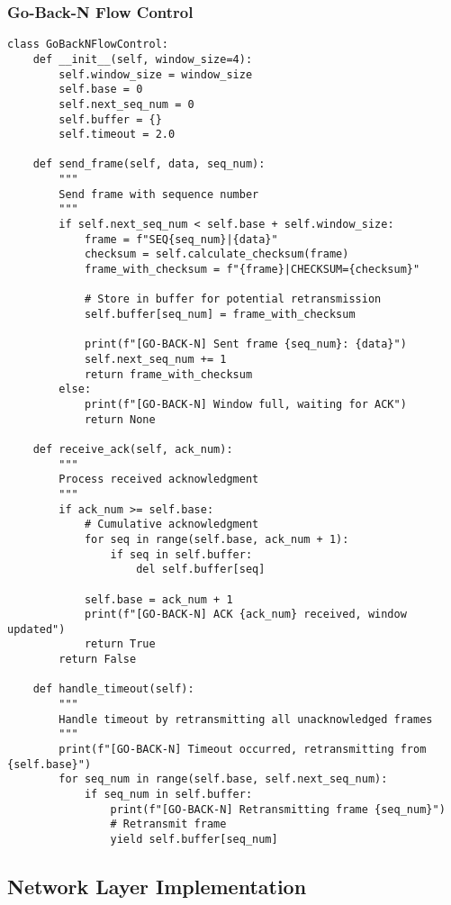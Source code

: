 \documentclass[12pt,a4paper]{article}
\begin{document}
\subsubsection{Go-Back-N Flow Control}

\begin{lstlisting}[caption=Go-Back-N Protocol Implementation]
class GoBackNFlowControl:
    def __init__(self, window_size=4):
        self.window_size = window_size
        self.base = 0
        self.next_seq_num = 0
        self.buffer = {}
        self.timeout = 2.0
        
    def send_frame(self, data, seq_num):
        """
        Send frame with sequence number
        """
        if self.next_seq_num < self.base + self.window_size:
            frame = f"SEQ{seq_num}|{data}"
            checksum = self.calculate_checksum(frame)
            frame_with_checksum = f"{frame}|CHECKSUM={checksum}"
            
            # Store in buffer for potential retransmission
            self.buffer[seq_num] = frame_with_checksum
            
            print(f"[GO-BACK-N] Sent frame {seq_num}: {data}")
            self.next_seq_num += 1
            return frame_with_checksum
        else:
            print(f"[GO-BACK-N] Window full, waiting for ACK")
            return None
    
    def receive_ack(self, ack_num):
        """
        Process received acknowledgment
        """
        if ack_num >= self.base:
            # Cumulative acknowledgment
            for seq in range(self.base, ack_num + 1):
                if seq in self.buffer:
                    del self.buffer[seq]
            
            self.base = ack_num + 1
            print(f"[GO-BACK-N] ACK {ack_num} received, window updated")
            return True
        return False
    
    def handle_timeout(self):
        """
        Handle timeout by retransmitting all unacknowledged frames
        """
        print(f"[GO-BACK-N] Timeout occurred, retransmitting from {self.base}")
        for seq_num in range(self.base, self.next_seq_num):
            if seq_num in self.buffer:
                print(f"[GO-BACK-N] Retransmitting frame {seq_num}")
                # Retransmit frame
                yield self.buffer[seq_num]
\end{lstlisting}

\subsection{Network Layer Implementation}
\end{document}
